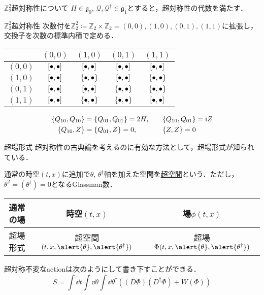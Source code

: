 \documentclass[dvipdfmx]{beamer}
\newcommand{\Z}{\mathbb{Z}}
\newcommand{\Ztt}{\mathbb{Z}_2^2}
\renewcommand{\i}{\mathrm{i}}
\newcommand{\Q}{\mathcal{Q}}
\newcommand{\g}{\mathfrak{g}}
\begin{document}
\begin{frame}
\begin{columns}[t]
\begin{column}{0.47\textwidth}
\begin{block}{$\Ztt$超対称性について}
					$H\in\g_0$, $\Q, \Q^\dag\in\g_1$とすると，超対称性の代数を満たす．
					\begin{itembox}{$\Ztt$超対称性}
						次数付を$\Ztt\coloneqq \Z_2 \times \Z_2 = {(0, 0), (1, 0), (0, 1), (1, 1)}$に拡張し，交換子を次数の標準内積で定める．
						\begin{table}[h]
							\centering
							\begin{tabular}{c|cccc}\hline
								 & $(0, 0)$ & $(1, 0)$ & $(0, 1)$ & $(1, 1)$\\\hline
								$(0, 0)$ & $\comm{\bullet}{\bullet}$ & $\comm{\bullet}{\bullet}$& $\comm{\bullet}{\bullet}$ & $\comm{\bullet}{\bullet}$\\
								$(1, 0)$ & $\comm{\bullet}{\bullet}$ & $\acomm{\bullet}{\bullet}$& $\comm{\bullet}{\bullet}$ & $\acomm{\bullet}{\bullet}$\\
								$(0, 1)$ & $\comm{\bullet}{\bullet}$ & $\comm{\bullet}{\bullet}$& $\acomm{\bullet}{\bullet}$ & $\acomm{\bullet}{\bullet}$\\
								$(1, 1)$ & $\comm{\bullet}{\bullet}$ & $\acomm{\bullet}{\bullet}$& $\acomm{\bullet}{\bullet}$ & $\comm{\bullet}{\bullet}$\\\hline
							\end{tabular}
						\end{table}
						\begin{alignat*}{3}
							\acomm{Q_{10}}{Q_{10}} &= \acomm{Q_{01}}{Q_{01}} = 2H, &\quad &\acomm{Q_{10}}{Q_{01}} = \i Z\\
							\acomm{Q_{10}}{Z} &= \acomm{Q_{01}}{Z} = 0, & & \acomm{Z}{Z} = 0
						\end{alignat*}
					\end{itembox}
				\end{block}

				\begin{block}{超場形式}
					超対称性の古典論を考えるのに有効な方法として，超場形式が知られている．

					通常の時空$(t, x)$に追加で$\theta$, $\theta^\dag$軸を加えた空間を\underline{超空間}という．ただし，$\theta^2 = (\theta^\dag) = 0$となるGlassman数．
					\begin{table}[h]
						\centering

						\begin{tabular}{c|cc}
							通常の場 & 時空$(t, x)$ &場$\phi(t, x)$ 	\\\hline
							超場形式 & \alert{超}空間$(t, x, \alert{\theta}, \alert{\theta^\dag})$ &\alert{超}場$\Phi(t, x, \alert{\theta}, \alert{\theta^\dag})$
						\end{tabular}
					\end{table}
					超対称不変なactionは次のようにして書き下すことができる．
					\[S = \int\dd{t}\int\dd{\theta}\int\dd{\theta^\dag} ((D\Phi)(D^\dag\Phi) + W(\Phi))\]


\end{block}
\end{column}
\end{columns}
\end{frame}
\end{document}
